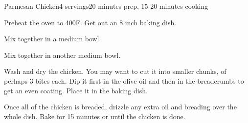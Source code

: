 \documentclass[../Cookbook.tex]{subfiles}
\begin{document}
\begin{recipe}{Parmesan Chicken}{4 servings}{20 minutes prep, 15-20 minutes cooking}

Preheat the oven to 400\0F. Get out an 8 inch baking dish.

Mix together in a medium bowl.

Mix together in another medium bowl.

Wash and dry the chicken. You may want to cut it into smaller chunks, of perhaps 3 bites each. Dip it first in the olive oil and then in the breadcrumbs to get an even coating. Place it in the baking dish.

\newstep
Once all of the chicken is breaded, drizzle any extra oil and breading over the whole dish.
Bake for 15 minutes or until the chicken is done.


\end{recipe}
\end{document}

